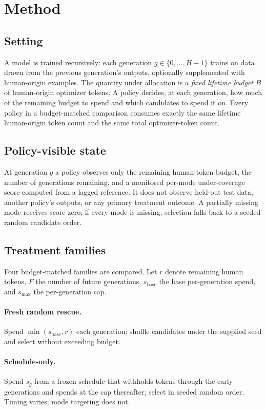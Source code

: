 \section{Method}
\label{sec:method}

\subsection{Setting}

A model is trained recursively: each generation $g \in \{0,\dots,H-1\}$ trains on data drawn
from the previous generation's outputs, optionally supplemented with human-origin examples.
The quantity under allocation is a \emph{fixed lifetime budget} $B$ of human-origin
optimizer tokens. A policy decides, at each generation, how much of the remaining budget to
spend and which candidates to spend it on. Every policy in a budget-matched comparison
consumes exactly the same lifetime human-origin token count and the same total
optimizer-token count.

\subsection{Policy-visible state}

At generation $g$ a policy observes only the remaining human-token budget, the number of
generations remaining, and a monitored per-mode under-coverage score computed from a lagged
reference. It does not observe held-out test data, another policy's outputs, or any primary
treatment outcome. A partially missing mode receives score zero; if every mode is missing,
selection falls back to a seeded random candidate order.

\subsection{Treatment families}

Four budget-matched families are compared. Let $r$ denote remaining human tokens, $F$ the
number of future generations, $s_{\text{base}}$ the base per-generation spend, and
$s_{\max}$ the per-generation cap.

\paragraph{Fresh random rescue.} Spend $\min(s_{\text{base}}, r)$ each generation; shuffle
candidates under the supplied seed and select without exceeding budget.

\paragraph{Schedule-only.} Spend $s_g$ from a frozen schedule that withholds tokens through
the early generations and spends at the cap thereafter; select in seeded random order.
Timing varies; mode targeting does not.

